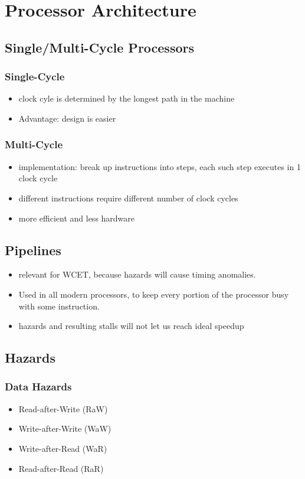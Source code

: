 \documentclass[german]{latex4ei/latex4ei_sheet}
\begin{document}
\section{Processor Architecture}
\begin{sectionbox}
\subsection{Single/Multi-Cycle Processors}
\subsubsection{Single-Cycle}
\begin{itemize}
\item clock cyle is determined by the longest path in the machine
\item Advantage: design is easier
\end{itemize}

\subsubsection{Multi-Cycle}
\begin{itemize}
\item implementation: break up instructions into steps, each such step executes in 1 clock cycle
\item different instructions require different number of clock cycles
\item more efficient and less hardware
\end{itemize}

\subsection{Pipelines}
\begin{itemize}
\item relevant for WCET, because hazards will cause timing anomalies.
\item Used in all modern processors, to keep every portion of the processor busy with some instruction.
\item hazards and resulting stalls will not let us reach ideal speedup
\end{itemize}

\subsection{Hazards}
\subsubsection{Data Hazards}
\begin{itemize}
\item Read-after-Write (RaW)
\item Write-after-Write (WaW)
\item Write-after-Read (WaR)
\item Read-after-Read (RaR)
\end{itemize}


\end{sectionbox}
\end{document}
